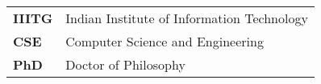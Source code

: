 \begin{table} [h]
\begin{tabular}{l l}  
		\textbf{IIITG} & Indian Institute of Information Technology\\ 
		\textbf{CSE} & Computer Science and Engineering\\
		\textbf{PhD} & Doctor of Philosophy
	\end{tabular}
\end{table} 